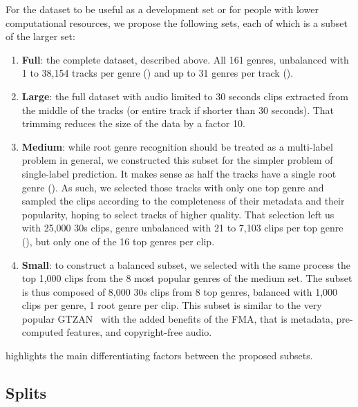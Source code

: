 \documentclass{article}
\newcommand{\todo}[1]{{\color{red} #1}}
\newcommand{\ngenres}{161 }
\begin{document}
For the dataset to be useful as a development set or for people with lower computational resources, we propose the following sets, each of which is a subset of the larger set:
\begin{enumerate}
	\item \textbf{Full}: the complete dataset, described above. All \ngenres genres, unbalanced with 1 to 38,154 tracks per genre () and up to 31 genres per track ().
	\item \textbf{Large}: the full dataset with audio limited to 30 seconds clips extracted from the middle of the tracks (or entire track if shorter than 30 seconds). That trimming reduces the size of the data by a factor 10.
	\item \textbf{Medium}: while root genre recognition should be treated as a multi-label problem in general, we constructed this subset for the simpler problem of single-label prediction. It makes sense as half the tracks have a single root genre (). As such, we selected those tracks with only one top genre and sampled the clips according to the completeness of their metadata and their popularity, hoping to select tracks of higher quality. That selection left us with 25,000 30s clips, genre unbalanced with 21 to 7,103 clips per top genre (), but only one of the 16 top genres per clip.
		\todo{}
	\item \textbf{Small}: to construct a balanced subset, we selected with the same process the top 1,000 clips from the 8 most popular genres of the medium set. The subset is thus composed of 8,000 30s clips from 8 top genres, balanced with 1,000 clips per genre, 1 root genre per clip. This subset is similar to the very popular GTZAN~\cite{gtzan} with the added benefits of the FMA, that is metadata, pre-computed features, and copyright-free audio.
\end{enumerate}
 highlights the main differentiating factors between the proposed subsets.

\subsection{Splits}
\end{document}
